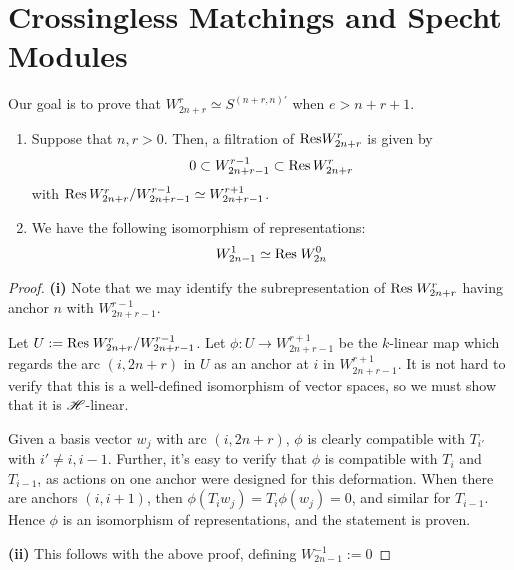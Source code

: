 \documentclass{amsart}
\begin{document}
\section{Crossingless Matchings and Specht Modules}
Our goal is to prove that $W_{2n + r}^r \simeq S^{(n+r,n)'}$ when $e > n + r + 1$.
\begin{proposition}
  \begin{enumerate}[label={(\roman*)}]
    \item
    Suppose that $n,r > 0$.
    Then, a filtration of $\text{Res} W_{2n + r}^r$ is given by
    \begin{equation}
      0 \subset W_{2n + r - 1}^{r-1} \subset \text{Res} \, W_{2n + r}^r \label{Filtration}
    \end{equation}
    with $\text{Res} \, W_{2n + r}^r / W_{2n + r - 1}^{r-1} \simeq W_{2n + r - 1}^{r + 1}$. 
    \item
      We have the following isomorphism of representations:
      \begin{equation}
        W_{2n - 1}^1 \simeq \text{Res} \; W_{2n}^0 \label{0 Restriction}
      \end{equation}
  \end{enumerate}
\end{proposition}
\begin{proof}
  \textbf{(i)}
  Note that we may identify the subrepresentation of $\text{Res} \; W_{2n + r}^r$ having anchor $n$ with $W_{2n + r - 1}^{r-1}$.
  
  Let $U := \text{Res} \; W_{2n + r}^r / W_{2n + r - 1}^{r - 1}$. 
  Let $\phi:U \rightarrow W_{2n + r - 1}^{r + 1}$ be the $k$-linear map which regards the arc $(i,2n + r)$ in $U$ as an anchor at $i$ in $W_{2n + r - 1}^{r + 1}$.
  It is not hard to verify that this is a well-defined isomorphism of vector spaces, so we must show that it is $\mathscr{H}$-linear.

  Given a basis vector $w_j$ with arc $(i,2n + r)$, $\phi$ is clearly compatible with $T_{i'}$ with $i' \neq i,i-1$.
  Further, it's easy to verify that $\phi$ is compatible with $T_{i}$ and $T_{i-1}$, as actions on one anchor were designed for this deformation.
  When there are anchors $(i,i+1)$, then $\phi(T_iw_j) = T_i\phi(w_j) = 0$, and similar for $T_{i -1}$.
  Hence $\phi$ is an isomorphism of representations, and the statement is proven.

  \textbf{(ii)}
  This follows with the above proof, defining $W_{2n - 1}^{-1} := 0$
\end{proof}
\end{document}
